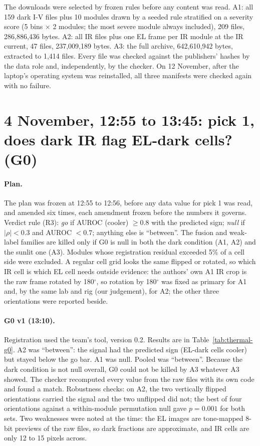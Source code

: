 The downloads were selected by frozen rules before any content was read. A1: all 159 dark I-V files plus 10 modules drawn by a
seeded rule stratified on a severity score (5 bins $\times$ 2 modules; the most severe module always included), 209 files,
286,886,436 bytes. A2: all IR files plus one EL frame per IR module at the IR current, 47 files, 237,009,189 bytes. A3: the full
archive, 642,610,942 bytes, extracted to 1,414 files. Every file was checked against the publishers' hashes by the data role and,
independently, by the checker. On 12 November, after the laptop's operating system was reinstalled, all three manifests were
checked again with no failure.

\section{4 November, 12:55 to 13:45: pick 1, does dark IR flag EL-dark cells? (G0)}\label{sec:thermal-g0}

\paragraph{Plan.} The plan was frozen at 12:55 to 12:56, before any data value for pick 1 was read, and amended six times, each
amendment frozen before the numbers it governs. Verdict rule (R3): \emph{go} if AUROC (cooler) $\geq 0.8$ with the predicted sign;
\emph{null} if $|\rho| < 0.3$ and AUROC $< 0.7$; anything else is ``between''. The fusion and weak-label families are killed only if
G0 is null in both the dark condition (A1, A2) and the sunlit one (A3). Modules whose registration residual exceeded 5\% of a cell side
were excluded. A regular cell grid looks the same flipped or rotated, so which IR cell is which EL cell needs outside evidence: the
authors' own A1 IR crop is the raw frame rotated by 180$^{\circ}$, so rotation by 180$^{\circ}$ was fixed as primary for A1 and, by
the same lab and rig (our judgement), for A2; the other three orientations were reported beside.

\paragraph{G0 v1 (13:10).} Registration used the team's tool, version 0.2. Results are in Table~\ref{tab:thermal-g0}. A2 was
``between'': the signal had the predicted sign (EL-dark cells cooler) but stayed below the go bar. A1 was null. Pooled was ``between''.
Because the dark condition is not null overall, G0 could not be killed by A3 whatever A3 showed. The checker recomputed every value
from the raw files with its own code and found a match. Robustness checks: on A2, the two vertically flipped orientations carried the
signal and the two unflipped did not; the best of four orientations against a within-module permutation null gave $p = 0.001$ for
both sets. Two weaknesses were noted at the time: the EL images are tone-mapped 8-bit previews of the raw files, so dark fractions are
approximate, and IR cells are only 12 to 15 pixels across.

